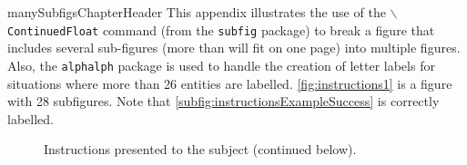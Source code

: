 {manySubfigsChapterHeader}%
This appendix illustrates the use of the $\backslash$\texttt{ContinuedFloat} command (from the \texttt{subfig} package) to break a figure that includes several sub-figures (more than will fit on one page) into multiple figures.
Also, the \texttt{alphalph} package is used to handle the creation of letter labels for situations where more than 26 entities are labelled.
\autoref{fig:instructions1} is a figure with 28 subfigures.
Note that \autoref{subfig:instructionsExampleSuccess} is correctly labelled.

%
\begin{figure}%
\centering%
%
\linebreak%
%
\caption[User Study Instructions]{%
  Instructions presented to the subject (continued below).
}%
\label{fig:instructions1}%
\end{figure}%

